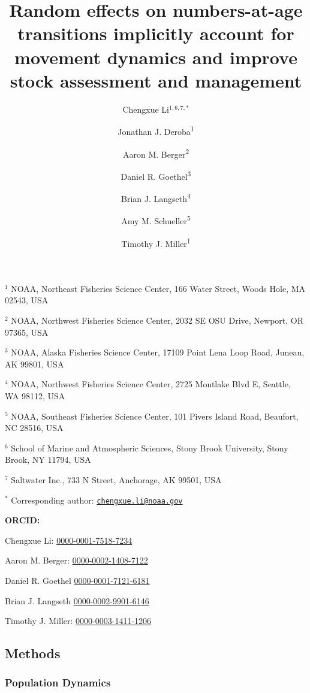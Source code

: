 \documentclass[
  12pt,
]{article}
\title{Random effects on numbers-at-age transitions implicitly account
for movement dynamics and improve stock assessment and management}
\author{Chengxue Li\(^{1,6,7,*}\) \and Jonathan J.
Deroba\textsuperscript{1} \and Aaron M.
Berger\textsuperscript{2} \and Daniel R.
Goethel\textsuperscript{3} \and Brian J.
Langseth\textsuperscript{4} \and Amy M.
Schueller\textsuperscript{5} \and Timothy J. Miller\textsuperscript{1}}
\date{}
\begin{document}
\maketitle

\(^{1}\) NOAA, Northeast Fisheries Science Center, 166 Water Street,
Woods Hole, MA 02543, USA

\(^{2}\) NOAA, Northwest Fisheries Science Center, 2032 SE OSU Drive,
Newport, OR 97365, USA

\(^{3}\) NOAA, Alaska Fisheries Science Center, 17109 Point Lena Loop
Road, Juneau, AK 99801, USA

\(^{4}\) NOAA, Northwest Fisheries Science Center, 2725 Montlake Blvd E,
Seattle, WA 98112, USA

\(^{5}\) NOAA, Southeast Fisheries Science Center, 101 Pivers Island
Road, Beaufort, NC 28516, USA

\(^{6}\) School of Marine and Atmospheric Sciences, Stony Brook
University, Stony Brook, NY 11794, USA

\(^{7}\) Saltwater Inc., 733 N Street, Anchorage, AK 99501, USA

\(^{*}\) Corresponding author:
\href{mailto:chengxue.li@noaa.gov}{\nolinkurl{chengxue.li@noaa.gov}}

\vspace{0.5cm}

\textbf{ORCID:}

Chengxue Li:
\href{https://orcid.org/0000-0001-7518-7234}{0000-0001-7518-7234}

Aaron M. Berger:
\href{https://orcid.org/0000-0002-1408-7122}{0000-0002-1408-7122}

Daniel R. Goethel
\href{https://orcid.org/0000-0001-7121-6181}{0000-0001-7121-6181}

Brian J. Langseth
\href{https://orcid.org/0000-0002-9901-6146}{0000-0002-9901-6146}

Timothy J. Miller:
\href{https://orcid.org/0000-0003-1411-1206}{0000-0003-1411-1206}

\pagebreak

\hypertarget{methods}{%
\subsection*{Methods}\label{methods}}

\hypertarget{population-dynamics}{%
\subsubsection*{Population Dynamics}\label{population-dynamics}}
\end{document}
